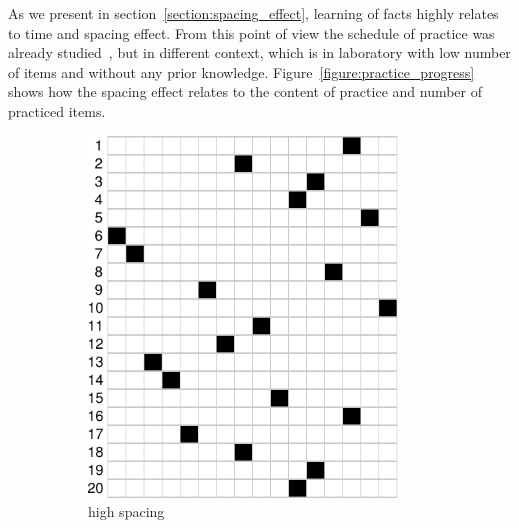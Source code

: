 \documentclass[table,color,cover,twoside,nolot,nolof]{fithesis3/fithesis3}
\begin{document}
As we present in section~\ref{section:spacing_effect}, learning of facts highly
relates to time and spacing effect. From this point of view the  schedule of
practice was already studied~\cite{pavlik2008schedule}, but in different
context, which is in laboratory with low number of items and without any prior
knowledge. Figure~\ref{figure:practice_progress} shows how the spacing effect
relates to the content of practice and number of practiced items.

\begin{figure}
	\begin{subfigure}[b]{.5\textwidth}
		\centering
		\includegraphics[width=0.9\textwidth]{figure/practice_progress_a}
		\caption{high spacing}
		\label{figure:practice_progress_a}
	\end{subfigure}
	\begin{subfigure}[b]{.5\textwidth}
		\centering

\end{subfigure}
\end{figure}
\end{document}
